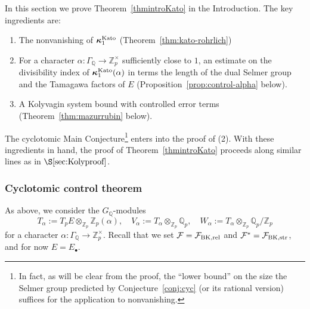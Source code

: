 \documentclass[10pt,reqno]{amsart}
\numberwithin{equation}{section}
\theoremstyle{plain}
\newtheorem{thm}{Theorem}[subsection] %
\theoremstyle{definition}
\theoremstyle{definition}
\theoremstyle{plain}
\theoremstyle{plain}
\theoremstyle{plain}
\theoremstyle{plain}
\theoremstyle{plain}
\theoremstyle{plain}
\newcommand{\Z}{\mathbb{Z}}
\newcommand{\Q}{\mathbb{Q}}
\newcommand{\Zp}{\mathbb{Z}_{p}}
\newcommand{\X}{\mathfrak{X}}
\newcommand{\bkappa}{\boldsymbol{\kappa}}
\DeclareMathOperator{\gal}{Gal}
\newcommand{\Fcal}{\mathcal{F}}
\newcommand{\rH}{\mathrm{H}}
\begin{document}
In this section we prove Theorem~\ref{thmintroKato} in the Introduction. The key ingredients are: 
\begin{enumerate}
\item The nonvanishing of $\bkappa^{\rm Kato}_{1}$ (Theorem~\ref{thm:kato-rohrlich})
\item For a character $\alpha:\Gamma_\Q\rightarrow\Z_p^\times$ sufficiently close to $1$, an estimate on the divisibility index of $\bkappa^{\rm Kato}_1(\alpha)$ in terms the length of the dual Selmer group and the Tamagawa factors of $E$ (Proposition~\ref{prop:control-alpha} below). 
\item A Kolyvagin system bound with controlled error terms  (Theorem~\ref{thm:mazurrubin} below).
\end{enumerate}
The cyclotomic Main Conjecture\footnote{In fact, as will be clear from the proof, the ``lower bound'' on the size the Selmer group predicted by Conjecture~\ref{conj:cyc} (or its rational version) suffices for the application to nonvanishing.} enters into the proof of (2). With these ingredients in hand, the proof of Theorem~\ref{thmintroKato} proceeds along  similar lines as in $\S\ref{sec:Kolyproof}$.
%
%


\subsubsection{Cyclotomic control theorem}

As above, %
we consider the $G_\Q$-modules 
\begin{equation}
T_\alpha:=T_pE\otimes_{\Z_p}\Zp(\alpha),\quad
V_\alpha:=T_\alpha\otimes_{\Z_p}\Q_p,\quad W_\alpha:=T_\alpha\otimes_{\Z_p}\Q_p/\Z_p\nonumber
\end{equation}
for a character $\alpha:\Gamma_\Q\rightarrow \Z_p^\times$. Recall that we set $\Fcal=\Fcal_{\rm{BK},\rm rel}$ and $\Fcal^*=\Fcal_{\rm{BK},\rm str}$, and for now $E=E_\bullet$. 


\end{document}
